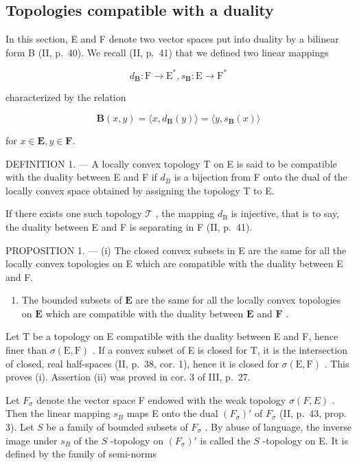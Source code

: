 \subsection{Topologies compatible with a duality}

In this section, E and F denote two vector spaces put into duality by a bilinear form B (II, p.~40). We recall (II, p.~41) that we defined two linear mappings

\[
d _ {\mathbf {B}}: \mathrm{F} \to \mathrm{E} ^ {*}, s _ {\mathbf {B}}: \mathrm{E} \to \mathrm{F} ^ {*}
\]

characterized by the relation

\[
\mathbf {B} (x, y) = \langle x, d _ {\mathbf {B}} (y) \rangle = \langle y, s _ {\mathbf {B}} (x) \rangle\tag{1}
\]

for \(x\in \mathbf{E},y\in \mathbf{F}.\)

DEFINITION 1. --- A locally convex topology T on E is said to be compatible with the duality between E and F if \(d_{B}\) is a bijection from F onto the dual of the locally convex space obtained by assigning the topology T to E.

If there exists one such topology \(\mathcal{T}\) , the mapping \(d_{\mathrm{B}}\) is injective, that is to say, the duality between E and F is separating in F (II, p.~41).

PROPOSITION 1. --- (i) The closed convex subsets in E are the same for all the locally convex topologies on E which are compatible with the duality between E and F.

\begin{enumerate}
\def\labelenumi{(\roman{enumi})}
\setcounter{enumi}{1}
\tightlist
\item
  The bounded subsets of \(\mathbf{E}\) are the same for all the locally convex topologies on \(\mathbf{E}\) which are compatible with the duality between \(\mathbf{E}\) and \(\mathbf{F}\) .
\end{enumerate}

Let T be a topology on E compatible with the duality between E and F, hence finer than \(\sigma(\mathrm{E},\mathrm{F})\) . If a convex subset of E is closed for T, it is the intersection of closed, real half-spaces (II, p.~38, cor. 1), hence it is closed for \(\sigma(\mathrm{E},\mathrm{F})\) . This proves (i). Assertion (ii) was proved in cor. 3 of III, p.~27.

Let \(F_{\sigma}\) denote the vector space F endowed with the weak topology \(\sigma(F, E)\) . Then the linear mapping \(s_{B}\) maps E onto the dual \((F_{\sigma})'\) of \(F_{\sigma}\) (II, p.~43, prop. 3). Let \(S\) be a family of bounded subsets of \(F_{\sigma}\) . By abuse of language, the inverse image under \(s_{B}\) of the \(S\) -topology on \((F_{\sigma})'\) is called the \(S\) -topology on E. It is defined by the family of semi-norms


